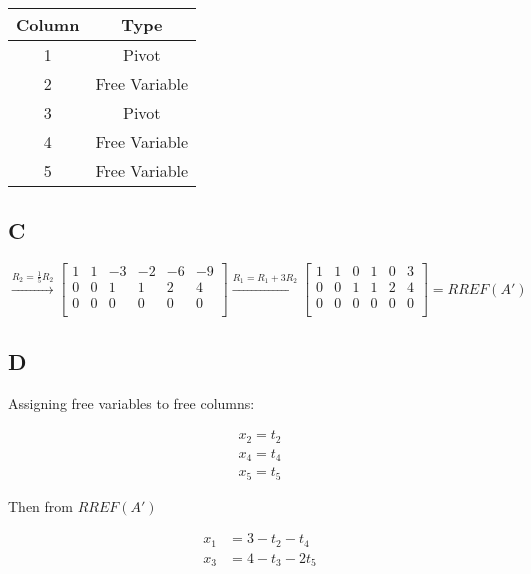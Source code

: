 \documentclass{report}
\begin{document}
\begin{table}[h!]
	\centering
	\begin{tabular}{|c|c|}
		\hline
		\textbf{Column} & \textbf{Type} \\ \hline
		1               & Pivot         \\ \hline
		2               & Free Variable \\ \hline
		3               & Pivot         \\ \hline
		4               & Free Variable \\ \hline
		5               & Free Variable \\ \hline
	\end{tabular}
	\label{tab:small_table}
\end{table}

\subsection*{C}

\[
	\xrightarrow{R_2 = \frac{1}{5}R_2}
	\begin{bmatrix}
		1 & 1 & -3 & -2 & -6 & -9 \\
		0 & 0 & 1  & 1  & 2  & 4  \\
		0 & 0 & 0  & 0  & 0  & 0  \\
	\end{bmatrix}
	\xrightarrow{R_1 = R_1 + 3R_2}
	\begin{bmatrix}
		1 & 1 & 0 & 1 & 0 & 3 \\
		0 & 0 & 1 & 1 & 2 & 4 \\
		0 & 0 & 0 & 0 & 0 & 0 \\
	\end{bmatrix}
	= RREF(A')
\]

\subsection*{D}

Assigning free variables to free columns:

\[
	\begin{aligned}
		x_2 = t_2 \\
		x_4 = t_4 \\
		x_5 = t_5
	\end{aligned}
\]

Then from $RREF(A')$

\[
	\begin{aligned}
		x_1 & = 3 - t_2 - t_4 \\
		x_3 & = 4 - t_3 -2t_5
	\end{aligned}
\]
\end{document}
